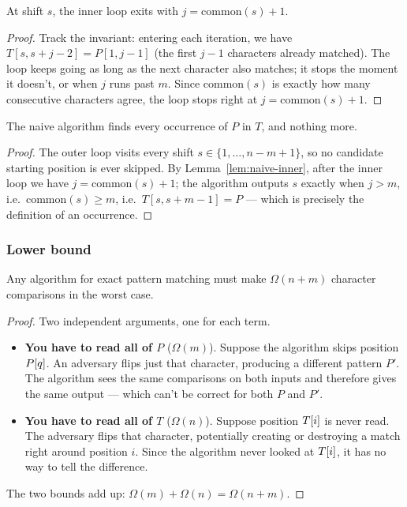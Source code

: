 \begin{formaldetails}
\begin{lemma}
  \label{lem:naive-inner}
  At shift $s$, the inner loop exits with $j = \mathrm{common}(s) + 1$.
\end{lemma}
\begin{proof}
  Track the invariant: entering each iteration, we have $T[s, s+j-2] = P[1, j-1]$
  (the first $j-1$ characters already matched).  The loop keeps going as long as
  the next character also matches; it stops the moment it doesn't, or when $j$
  runs past $m$.  Since $\mathrm{common}(s)$ is exactly how many consecutive
  characters agree, the loop stops right at $j = \mathrm{common}(s)+1$.
\end{proof}

\begin{theorem}
  The naive algorithm finds every occurrence of $P$ in $T$, and nothing more.
\end{theorem}
\begin{proof}
  The outer loop visits every shift $s \in \{1, \ldots, n-m+1\}$, so no candidate
  starting position is ever skipped.  By Lemma~\ref{lem:naive-inner}, after the
  inner loop we have $j = \mathrm{common}(s)+1$; the algorithm outputs $s$
  exactly when $j > m$, i.e.\ $\mathrm{common}(s) \geq m$, i.e.\
  $T[s, s+m-1] = P$ — which is precisely the definition of an occurrence.
\end{proof}
\end{formaldetails}

\subsubsection{Lower bound}

\begin{formaldetails}
\begin{theorem}
  Any algorithm for exact pattern matching must make $\Omega(n + m)$ character
  comparisons in the worst case.
\end{theorem}
\begin{proof}
  Two independent arguments, one for each term.
  \begin{itemize}
    \item \textbf{You have to read all of $P$} ($\Omega(m)$). Suppose the algorithm
          skips position $P\kern0pt[q]$. An adversary flips just that character, producing
          a different pattern $P'$. The algorithm sees the same comparisons on both
          inputs and therefore gives the same output — which can't be correct for
          both $P$ and $P'$.
    \item \textbf{You have to read all of $T$} ($\Omega(n)$). Suppose position
          $T\kern0pt[i]$ is never read. The adversary flips that character, potentially
          creating or destroying a match right around position $i$. Since the
          algorithm never looked at $T\kern0pt[i]$, it has no way to tell the difference.
  \end{itemize}
  The two bounds add up: $\Omega(m) + \Omega(n) = \Omega(n + m)$.
\end{proof}
\end{formaldetails}

